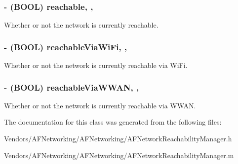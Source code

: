 \subsubsection[{reachable}]{\setlength{\rightskip}{0pt plus 5cm}-\/ (B\+O\+O\+L) reachable\hspace{0.3cm}{\ttfamily [read]}, {\ttfamily [nonatomic]}, {\ttfamily [assign]}}\label{interface_a_f_network_reachability_manager_a9c2f8249d282f08b770172b86d021983}
Whether or not the network is currently reachable. \hypertarget{interface_a_f_network_reachability_manager_a8ada1e526c4f63340a2f893fe4b4e947}{}
\subsubsection[{reachable\+Via\+Wi\+Fi}]{\setlength{\rightskip}{0pt plus 5cm}-\/ (B\+O\+O\+L) reachable\+Via\+Wi\+Fi\hspace{0.3cm}{\ttfamily [read]}, {\ttfamily [nonatomic]}, {\ttfamily [assign]}}\label{interface_a_f_network_reachability_manager_a8ada1e526c4f63340a2f893fe4b4e947}
Whether or not the network is currently reachable via Wi\+Fi. \hypertarget{interface_a_f_network_reachability_manager_a3bf818f1daba31c4b15949679d348025}{}
\subsubsection[{reachable\+Via\+W\+W\+A\+N}]{\setlength{\rightskip}{0pt plus 5cm}-\/ (B\+O\+O\+L) reachable\+Via\+W\+W\+A\+N\hspace{0.3cm}{\ttfamily [read]}, {\ttfamily [nonatomic]}, {\ttfamily [assign]}}\label{interface_a_f_network_reachability_manager_a3bf818f1daba31c4b15949679d348025}
Whether or not the network is currently reachable via W\+W\+A\+N. 

The documentation for this class was generated from the following files\+:\begin{DoxyCompactItemize}
\item 
Vendors/\+A\+F\+Networking/\+A\+F\+Networking/A\+F\+Network\+Reachability\+Manager.\+h\item 
Vendors/\+A\+F\+Networking/\+A\+F\+Networking/A\+F\+Network\+Reachability\+Manager.\+m\end{DoxyCompactItemize}
